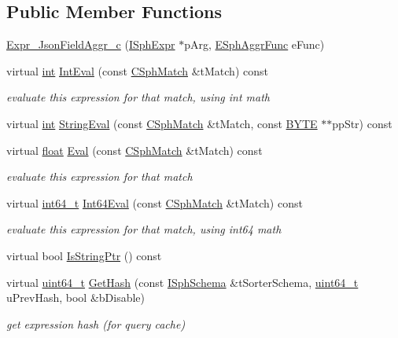 \subsection*{Public Member Functions}
\begin{DoxyCompactItemize}
\item 
\hyperlink{structExpr__JsonFieldAggr__c_a02e500834a8429a0237bd85abb13172e}{Expr\-\_\-\-Json\-Field\-Aggr\-\_\-c} (\hyperlink{structISphExpr}{I\-Sph\-Expr} $\ast$p\-Arg, \hyperlink{sphinx_8h_a92532037c3ec9dad4a636e957fff58c9}{E\-Sph\-Aggr\-Func} e\-Func)
\item 
virtual \hyperlink{sphinxexpr_8cpp_a4a26e8f9cb8b736e0c4cbf4d16de985e}{int} \hyperlink{structExpr__JsonFieldAggr__c_a1c5efb1bd27c56b06f85d06dd6a8e4ee}{Int\-Eval} (const \hyperlink{classCSphMatch}{C\-Sph\-Match} \&t\-Match) const 
\begin{DoxyCompactList}\small\item\em evaluate this expression for that match, using int math \end{DoxyCompactList}\item 
virtual \hyperlink{sphinxexpr_8cpp_a4a26e8f9cb8b736e0c4cbf4d16de985e}{int} \hyperlink{structExpr__JsonFieldAggr__c_ae1479f9f9c62c25d1577e96813b877bf}{String\-Eval} (const \hyperlink{classCSphMatch}{C\-Sph\-Match} \&t\-Match, const \hyperlink{sphinxstd_8h_a4ae1dab0fb4b072a66584546209e7d58}{B\-Y\-T\-E} $\ast$$\ast$pp\-Str) const 
\item 
virtual \hyperlink{sphinxexpr_8cpp_a0e0d0739f7035f18f949c2db2c6759ec}{float} \hyperlink{structExpr__JsonFieldAggr__c_a2f420ad14c535a6e1788054225bb5a94}{Eval} (const \hyperlink{classCSphMatch}{C\-Sph\-Match} \&t\-Match) const 
\begin{DoxyCompactList}\small\item\em evaluate this expression for that match \end{DoxyCompactList}\item 
virtual \hyperlink{sphinxstd_8h_a996e72f71b11a5bb8b3b7b6936b1516d}{int64\-\_\-t} \hyperlink{structExpr__JsonFieldAggr__c_a9c76bc9ee851932e51a82834ecdc94a2}{Int64\-Eval} (const \hyperlink{classCSphMatch}{C\-Sph\-Match} \&t\-Match) const 
\begin{DoxyCompactList}\small\item\em evaluate this expression for that match, using int64 math \end{DoxyCompactList}\item 
virtual bool \hyperlink{structExpr__JsonFieldAggr__c_a4e5c1b96e6b1af5d103be7c740dbb19b}{Is\-String\-Ptr} () const 
\item 
virtual \hyperlink{sphinxstd_8h_aaa5d1cd013383c889537491c3cfd9aad}{uint64\-\_\-t} \hyperlink{structExpr__JsonFieldAggr__c_a07d66e3ec962a2498d44c33f20b0a2c6}{Get\-Hash} (const \hyperlink{classISphSchema}{I\-Sph\-Schema} \&t\-Sorter\-Schema, \hyperlink{sphinxstd_8h_aaa5d1cd013383c889537491c3cfd9aad}{uint64\-\_\-t} u\-Prev\-Hash, bool \&b\-Disable)
\begin{DoxyCompactList}\small\item\em get expression hash (for query cache) \end{DoxyCompactList}\end{DoxyCompactItemize}
